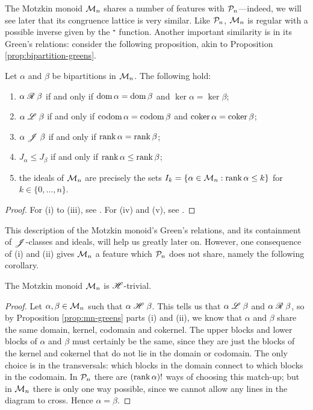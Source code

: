 The Motzkin monoid $\mathcal{M}_n$ shares a number of features with $\mathcal{P}_n$---indeed,
we will see later that its congruence lattice is very similar.  Like $\mathcal{P}_n$,
$\mathcal{M}_n$ is regular with a possible inverse given by the $^\star$
function. Another important similarity is in its Green's relations: consider the
following proposition, akin to Proposition \ref{prop:bipartition-greens}.

\begin{proposition}
  \label{prop:mn-greens}
  Let $\alpha$ and $\beta$ be bipartitions in $\mathcal{M}_n$.  The following hold:
  \begin{enumerate}[\rm(i)]
  \item $\alpha \mathrel{\mathscr{R}} \beta$ if and only if $\operatorname{dom} \alpha = \operatorname{dom} \beta$ and
    $\ker \alpha = \ker \beta$;
  \item $\alpha \mathrel{\mathscr{L}} \beta$ if and only if $\operatorname{codom} \alpha = \operatorname{codom} \beta$ and
    $\operatorname{coker} \alpha = \operatorname{coker} \beta$;
  \item $\alpha \mathrel{\mathscr{J}} \beta$ if and only if $\operatorname{rank} \alpha = \operatorname{rank} \beta$;
  \item $J_\alpha \leq J_\beta$ if and only if $\operatorname{rank} \alpha \leq \operatorname{rank} \beta$;
  \item the ideals of $\mathcal{M}_n$ are precisely the sets
    $I_k=\{\alpha \in \mathcal{M}_n : \operatorname{rank} \alpha \leq k\}$ for
    $k \in \{0, \ldots, n\}$.
  \end{enumerate}
  \begin{proof}
    For (i) to (iii), see \cite[Theorem 2.4]{deg_motzkin}.  For (iv) and (v),
    see \cite[Proposition 2.6]{deg_motzkin}.
  \end{proof}
\end{proposition}

This description of the Motzkin monoid's Green's relations, and its containment
of $\mathrel{\mathscr{J}}$-classes and ideals, will help us greatly later on.  However, one
consequence of (i) and (ii) gives $\mathcal{M}_n$ a feature which $\mathcal{P}_n$ does not
share, namely the following corollary.

\begin{corollary}
  \label{cor:mn-h-trivial}
  The Motzkin monoid $\mathcal{M}_n$ is $\mathrel{\mathscr{H}}$-trivial.
  \begin{proof}
    Let $\alpha, \beta \in \mathcal{M}_n$ such that $\alpha \mathrel{\mathscr{H}} \beta$.  This tells us
    that $\alpha \mathrel{\mathscr{L}} \beta$ and $\alpha \mathrel{\mathscr{R}} \beta$, so by Proposition
    \ref{prop:mn-greens} parts (i) and (ii), we know that $\alpha$ and $\beta$
    share the same domain, kernel, codomain and cokernel.  The upper blocks and
    lower blocks of $\alpha$ and $\beta$ must certainly be the same, since they
    are just the blocks of the kernel and cokernel that do not lie in the domain
    or codomain.  The only choice is in the transversals: which blocks in the
    domain connect to which blocks in the codomain.  In $\mathcal{P}_n$ there are
    $(\operatorname{rank} \alpha)!$ ways of choosing this match-up; but in $\mathcal{M}_n$ there is
    only one way possible, since we cannot allow any lines in the diagram to
    cross.  Hence $\alpha = \beta$.
  \end{proof}
\end{corollary}

